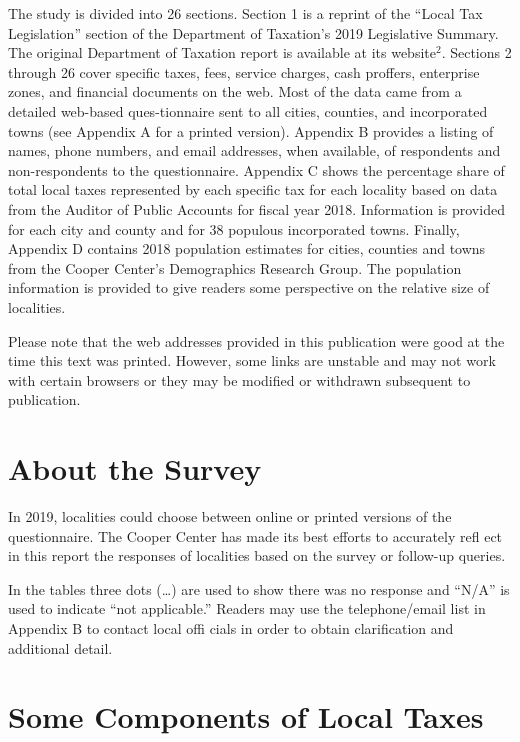 \documentclass[
]{book}
\begin{document}
The study is divided into 26 sections. Section 1 is a reprint of the ``Local Tax Legislation'' section of the Department of Taxation's 2019 Legislative Summary. The original Department of Taxation report is available at its website\(^2\). Sections 2 through 26 cover specific taxes, fees, service charges, cash proffers, enterprise zones, and financial documents on the web. Most of the data came from a detailed web-based ques-tionnaire sent to all cities, counties, and incorporated towns (see Appendix A for a printed version). Appendix B provides a listing of names, phone numbers, and email addresses, when available, of respondents and non-respondents to the questionnaire. Appendix C shows the percentage share of total local taxes represented by each specific tax for each locality based on data from the Auditor of Public Accounts for fiscal year 2018. Information is provided for each city and county and for 38 populous incorporated towns. Finally, Appendix D contains 2018 population estimates for cities, counties and towns from the Cooper Center's Demographics Research Group. The population information is provided to give readers some perspective on the relative size of localities.

Please note that the web addresses provided in this publication were good at the time this text was printed. However, some links are unstable and may not work with certain browsers or they may be modified or withdrawn subsequent to publication.

\hypertarget{about-the-survey}{%
\section*{About the Survey}\label{about-the-survey}}

In 2019, localities could choose between online or printed versions of the questionnaire. The Cooper Center has made its best efforts to accurately refl ect in this report the responses of localities based on the survey or follow-up queries.

In the tables three dots (\ldots) are used to show there was no response and ``N/A'' is used to indicate ``not applicable.'' Readers may use the telephone/email list in Appendix B to contact local offi cials in order to obtain clarification and additional detail.

\hypertarget{some-components-of-local-taxes}{%
\section*{Some Components of Local Taxes}\label{some-components-of-local-taxes}}
\end{document}
